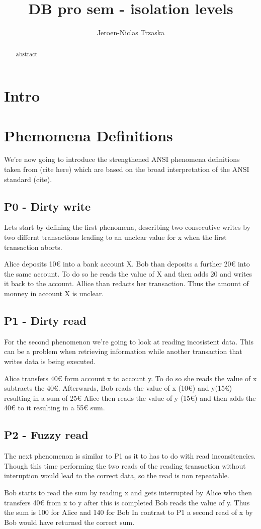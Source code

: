 \documentclass[sigconf, review=true]{acmart}
\author{Jeroen-Niclas Trzaska}
\title{DB pro sem - isolation levels}
\begin{document}
\begin{abstract}
    abstract
\end{abstract}
\maketitle
\section{Intro}
\section{Phemomena Definitions}
We're now going to introduce the strengthened ANSI phenomena definitions taken from (cite here) which
are based on the broad interpretation of the ANSI standard (cite).


\subsection{P0 - Dirty write}
Lets start by defining the first phenomena, describing two consecutive writes by two differnt
transactions leading to an unclear value for x when the first transaction aborts.

\begin{example}
    Alice deposits 10€ into a bank account X.
    Bob than deposits a further 20€ into the same account.
    To do so he reads the value of X and then adds 20 and writes it back to the account.
    Allice than redacts her transaction.
    Thus the amount of monney in account X is unclear.
\end{example}

\subsection{P1 - Dirty read}
For the second phenomenon we're going to look at reading incosistent data.
This can be a problem when retrieving information while another transaction
that writes data is being executed.
\begin{example}
    Alice transfers 40€ form account x to account y.
    To do so she reads the value of x subtracts the 40€.
    Afterwards, Bob reads the value of x (10€) and y(15€) resulting in a sum of 25€
    Alice then reads the value of y (15€) and then adds the 40€ to it resulting in a 55€ sum.
\end{example}

\subsection{P2 - Fuzzy read}
The next phenomenon is similar to P1 as it to has to do with read inconsitencies.
Though this time performing the two reads of the reading transaction without interuption would lead
to the correct data, so the read is non repeatable.
\begin{example}
    Bob starts to read the sum by reading x and gets interrupted by Alice who then transfers 40€ from x to y after this is completed Bob reads the value of y.
    Thus the sum is 100 for Alice and 140 for Bob
    In contrast to P1 a second read of x by Bob would have returned the correct sum.
\end{example}
\end{document}
